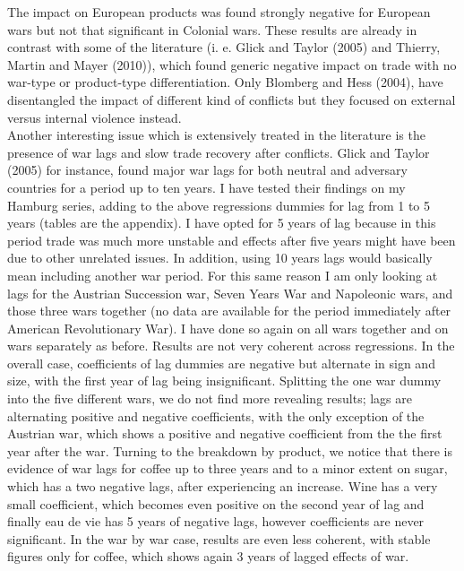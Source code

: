 \documentclass[12pt,a4paper,titlepage]{article}
\begin{document}
The impact on European products was found strongly negative for European wars but not that significant in Colonial wars. These results are already in contrast with some of the literature (i. e. Glick and Taylor (2005) and Thierry, Martin and Mayer (2010)), which found generic negative impact on trade with no war-type or product-type differentiation. Only Blomberg and Hess (2004), have disentangled the impact of different kind of conflicts but they focused on external versus internal violence instead.\\
Another interesting issue which is extensively treated in the literature is the presence of war lags and slow trade recovery after conflicts. Glick and Taylor (2005) for instance, found major war lags for both neutral and adversary countries for a period up to ten years. I have tested their findings on my Hamburg series, adding to the above regressions dummies for lag from 1 to 5 years (tables are the appendix). I have opted for 5 years of lag because in this period trade was much more unstable and effects after five years might have been due to other unrelated issues. In addition, using 10 years lags would basically mean including another war period. For this same reason I am only looking at lags for the Austrian Succession war, Seven Years War and Napoleonic wars, and those three wars together (no data are available for the period immediately after American Revolutionary War). I have done so again on all wars together and on wars separately as before. Results are not very coherent across regressions. In the overall case, coefficients of lag dummies are negative but alternate in  sign and size, with the first year of lag being insignificant. Splitting the one war dummy into the five different wars, we do not find more revealing results; lags are alternating positive and negative coefficients, with the only exception of the Austrian war, which shows a positive and negative coefficient from the the first year after the war. Turning to the breakdown by product, we notice that there is evidence of war lags for coffee up to three years and to a minor extent on sugar, which has a two negative lags, after experiencing an increase. Wine has a very small coefficient, which becomes even positive on the second year of lag and finally eau de vie has 5 years of negative lags, however coefficients are never significant. In the war by war case, results are even less coherent, with stable figures only for coffee, which shows again 3 years of lagged effects of war. \\~\\
\end{document}
